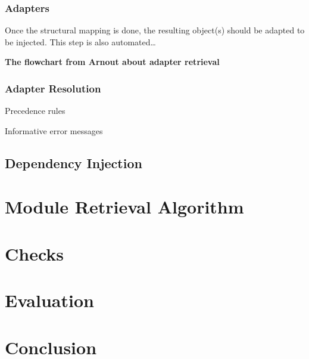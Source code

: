 \documentclass{llncs}
\begin{document}
\subsubsection{Adapters}
Once the structural mapping is done, the resulting object(s) should be adapted to be injected. This step is also automated\ldots

\textbf{The flowchart from Arnout about adapter retrieval}

\subsubsection{Adapter Resolution}
Precedence rules

Informative error messages
\subsection{Dependency Injection}\label{sec:zamk:di}

\section{Module Retrieval Algorithm}
\section{Checks}
\label{zamk:sec:checks}
\section{Evaluation}

\section{Conclusion}
\label{zamk:sec:conclusion}



\end{document}

